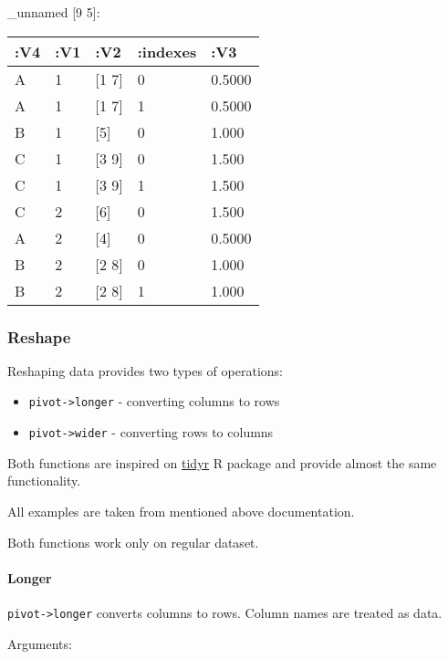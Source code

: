 \documentclass[]{article}
\providecommand{\tightlist}{%
  \setlength{\itemsep}{0pt}\setlength{\parskip}{0pt}}
\let\oldparagraph\paragraph
\renewcommand{\paragraph}[1]{\oldparagraph{#1}\mbox{}}
\begin{document}
\_unnamed {[}9 5{]}:

\begin{longtable}[]{@{}lllll@{}}
\toprule
:V4 & :V1 & :V2 & :indexes & :V3\tabularnewline
\midrule
\endhead
A & 1 & {[}1 7{]} & 0 & 0.5000\tabularnewline
A & 1 & {[}1 7{]} & 1 & 0.5000\tabularnewline
B & 1 & {[}5{]} & 0 & 1.000\tabularnewline
C & 1 & {[}3 9{]} & 0 & 1.500\tabularnewline
C & 1 & {[}3 9{]} & 1 & 1.500\tabularnewline
C & 2 & {[}6{]} & 0 & 1.500\tabularnewline
A & 2 & {[}4{]} & 0 & 0.5000\tabularnewline
B & 2 & {[}2 8{]} & 0 & 1.000\tabularnewline
B & 2 & {[}2 8{]} & 1 & 1.000\tabularnewline
\bottomrule
\end{longtable}

\subsubsection{Reshape}\label{reshape}

Reshaping data provides two types of operations:

\begin{itemize}
\tightlist
\item
  \texttt{pivot-\textgreater{}longer} - converting columns to rows
\item
  \texttt{pivot-\textgreater{}wider} - converting rows to columns
\end{itemize}

Both functions are inspired on
\href{https://tidyr.tidyverse.org/articles/pivot.html}{tidyr} R package
and provide almost the same functionality.

All examples are taken from mentioned above documentation.

Both functions work only on regular dataset.

\paragraph{Longer}\label{longer}

\texttt{pivot-\textgreater{}longer} converts columns to rows. Column
names are treated as data.

Arguments:
\end{document}
